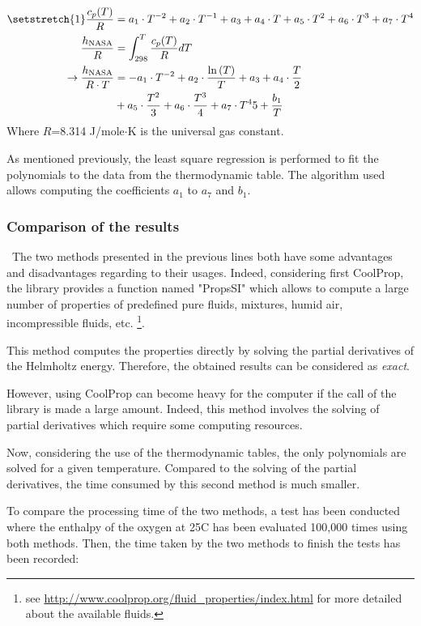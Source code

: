 \begin{align}
\setstretch{1}
   \frac{c_p(T)}{R} &=  a_1\cdot T^{-2} + a_2\cdot T^{-1} + a_3 + a_4\cdot T
 + a_5\cdot T^2 + a_6\cdot T^3 + a_7\cdot T^4\label{eq:C7_NASACP}\\
    \frac{h_\text{NASA}}{R} &= \int_{298}^T\frac{c_p(T)}{R}dT\nonumber\\
    \rightarrow \frac{h_\text{NASA}}{R\cdot T} &=-a_1\cdot T^{-2} + a_2\cdot \frac{\ln{(T)}}{T} + a_3 + a_4\cdot \frac{T}{2}\label{eq:C7_NASAH}\\
    &+ a_5\cdot \frac{T^2}{3}
         + a_6\cdot \frac{T^3}{4} + a_7\cdot {T^4}{5} + \frac{b_1}{T}\nonumber
\end{align}
Where $R$=8.314 J/mole$\cdot$K is the universal gas constant. 

As mentioned previously, the least square regression is performed to fit the polynomials to the data from the thermodynamic table. The algorithm used allows computing the coefficients $a_1$ to $a_7$ and $b_1$. 

\subsubsection{Comparison of the results}
\quad\ The two methods presented in the previous lines both have some advantages and disadvantages regarding to their usages. Indeed, considering first CoolProp, the library provides a function named "PropsSI" which allows to compute a large number of properties of predefined pure fluids, mixtures, humid air, incompressible fluids, etc. \footnote{see \url{http://www.coolprop.org/fluid_properties/index.html} for more detailed about the available fluids.}. 


This method computes the properties directly by solving the partial derivatives of the Helmholtz energy. Therefore, the obtained results can be considered as \textit{exact}.

However, using CoolProp can become heavy for the computer if the call of the library is made a large amount.  Indeed, this method involves the solving of partial derivatives which require some computing resources.

Now, considering the use of the thermodynamic tables, the only polynomials are solved for a given temperature. Compared to the solving of the partial derivatives, the time consumed by this second method is much smaller. 

To compare the processing time of the two methods, a test has been conducted where the enthalpy of the oxygen at 25\degree C has been evaluated 100,000 times using both methods. Then, the time taken by the two methods to finish the tests has been recorded:

